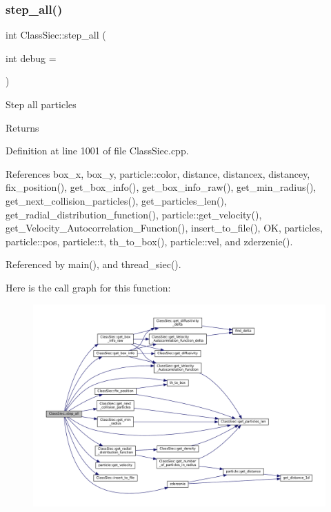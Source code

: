 \subsubsection{\texorpdfstring{step\+\_\+all()}{step\_all()}}
{\footnotesize\ttfamily int Class\+Siec\+::step\+\_\+all (\begin{DoxyParamCaption}\item[{int}]{debug = {} }\end{DoxyParamCaption})}

Step all particles \begin{DoxyReturn}{Returns}

\end{DoxyReturn}


Definition at line 1001 of file Class\+Siec.\+cpp.



References box\+\_\+x, box\+\_\+y, particle\+::color, distance, distancex, distancey, fix\+\_\+position(), get\+\_\+box\+\_\+info(), get\+\_\+box\+\_\+info\+\_\+raw(), get\+\_\+min\+\_\+radius(), get\+\_\+next\+\_\+collision\+\_\+particles(), get\+\_\+particles\+\_\+len(), get\+\_\+radial\+\_\+distribution\+\_\+function(), particle\+::get\+\_\+velocity(), get\+\_\+\+Velocity\+\_\+\+Autocorrelation\+\_\+\+Function(), insert\+\_\+to\+\_\+file(), OK, particles, particle\+::pos, particle\+::t, th\+\_\+to\+\_\+box(), particle\+::vel, and zderzenie().



Referenced by main(), and thread\+\_\+siec().

Here is the call graph for this function\+:
\nopagebreak
\begin{figure}[H]
\begin{center}
\leavevmode
\includegraphics[width=350pt]{classClassSiec_a0de17762248441c53936ee7924776052_cgraph}
\end{center}
\end{figure}


